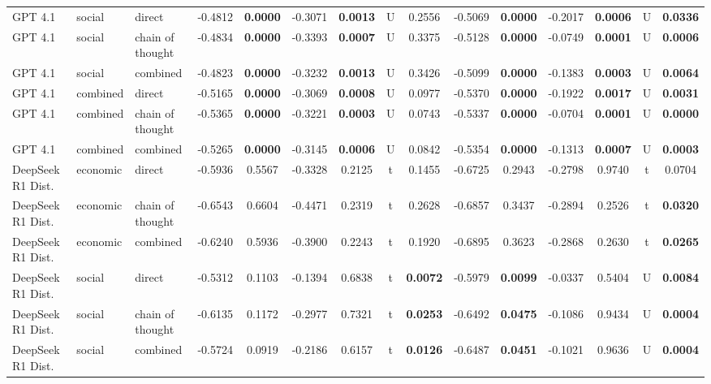 \begin{center}
\begin{longtable}{@{}lll|cccccc|cccccc@{}}
        GPT 4.1 & social & direct & -0.4812 & \textbf{0.0000} & -0.3071 & \textbf{0.0013} & U & 0.2556 & -0.5069 & \textbf{0.0000} & -0.2017 & \textbf{0.0006} & U & \textbf{0.0336} \\
        GPT 4.1 & social & chain of thought & -0.4834 & \textbf{0.0000} & -0.3393 & \textbf{0.0007} & U & 0.3375 & -0.5128 & \textbf{0.0000} & -0.0749 & \textbf{0.0001} & U & \textbf{0.0006} \\
        GPT 4.1 & social & combined & -0.4823 & \textbf{0.0000} & -0.3232 & \textbf{0.0013} & U & 0.3426 & -0.5099 & \textbf{0.0000} & -0.1383 & \textbf{0.0003} & U & \textbf{0.0064} \\
        GPT 4.1 & combined & direct & -0.5165 & \textbf{0.0000} & -0.3069 & \textbf{0.0008} & U & 0.0977 & -0.5370 & \textbf{0.0000} & -0.1922 & \textbf{0.0017} & U & \textbf{0.0031} \\
        GPT 4.1 & combined & chain of thought & -0.5365 & \textbf{0.0000} & -0.3221 & \textbf{0.0003} & U & 0.0743 & -0.5337 & \textbf{0.0000} & -0.0704 & \textbf{0.0001} & U & \textbf{0.0000} \\
        \rowcolor{gray!20} GPT 4.1 & combined & combined & -0.5265 & \textbf{0.0000} & -0.3145 & \textbf{0.0006} & U & 0.0842 & -0.5354 & \textbf{0.0000} & -0.1313 & \textbf{0.0007} & U & \textbf{0.0003} \\
        DeepSeek R1 Dist. & economic & direct & -0.5936 & 0.5567 & -0.3328 & 0.2125 & t & 0.1455 & -0.6725 & 0.2943 & -0.2798 & 0.9740 & t & 0.0704 \\
        DeepSeek R1 Dist. & economic & chain of thought & -0.6543 & 0.6604 & -0.4471 & 0.2319 & t & 0.2628 & -0.6857 & 0.3437 & -0.2894 & 0.2526 & t & \textbf{0.0320} \\
        DeepSeek R1 Dist. & economic & combined & -0.6240 & 0.5936 & -0.3900 & 0.2243 & t & 0.1920 & -0.6895 & 0.3623 & -0.2868 & 0.2630 & t & \textbf{0.0265} \\
        DeepSeek R1 Dist. & social & direct & -0.5312 & 0.1103 & -0.1394 & 0.6838 & t & \textbf{0.0072} & -0.5979 & \textbf{0.0099} & -0.0337 & 0.5404 & U & \textbf{0.0084} \\
        DeepSeek R1 Dist. & social & chain of thought & -0.6135 & 0.1172 & -0.2977 & 0.7321 & t & \textbf{0.0253} & -0.6492 & \textbf{0.0475} & -0.1086 & 0.9434 & U & \textbf{0.0004} \\
        DeepSeek R1 Dist. & social & combined & -0.5724 & 0.0919 & -0.2186 & 0.6157 & t & \textbf{0.0126} & -0.6487 & \textbf{0.0451} & -0.1021 & 0.9636 & U & \textbf{0.0004} \\

\end{longtable}
\end{center}
